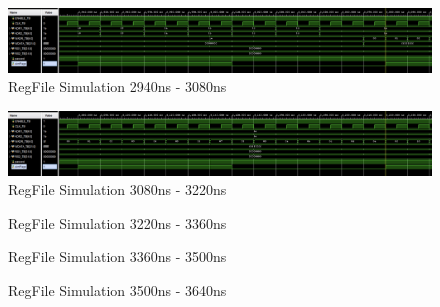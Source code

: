 \documentclass[
    a4paper, %
	12pt, %
    ]{CSSullivanBusinessReport}
\begin{document}
\begin{fullwidth}
\begin{figure}
    \centering
    \captionsetup{style=widetable}
    \includegraphics[width=.80\pdfpagewidth]{Figures/RegFile Simulation 21.png}
    \caption{RegFile Simulation 2940ns - 3080ns}
    \label{fig:regfilesim22}
\end{figure}

\begin{figure}
    \centering
    \captionsetup{style=widetable}
    \includegraphics[width=.80\pdfpagewidth]{Figures/RegFile Simulation 22.png}
    \caption{RegFile Simulation 3080ns - 3220ns}
    \label{fig:regfilesim23}
\end{figure}

\begin{figure}
    \centering
    \captionsetup{style=widetable}
    \caption{RegFile Simulation 3220ns - 3360ns}
    \label{fig:regfilesim24}
\end{figure}

\begin{figure}
    \centering
    \captionsetup{style=widetable}
    \caption{RegFile Simulation 3360ns - 3500ns}
    \label{fig:regfilesim25}
\end{figure}

\begin{figure}
    \centering
    \captionsetup{style=widetable}
    \caption{RegFile Simulation 3500ns - 3640ns}
    \label{fig:regfilesim26}
\end{figure}


\end{fullwidth}
\end{document}
